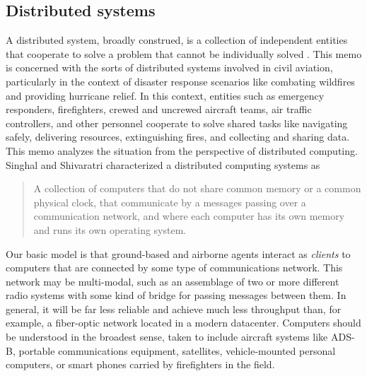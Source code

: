 \subsection{Distributed systems}
A distributed system, broadly construed, is a collection of
independent entities that cooperate to solve a problem that cannot be
individually solved \cite{kshemkalyani_singhal_2008}. This memo is
concerned with the sorts of distributed systems involved in civil
aviation, particularly in the context of disaster response scenarios
like combating wildfires and providing hurricane relief. In this
context, entities such as emergency responders, firefighters, crewed
and uncrewed aircraft teams, air traffic controllers, and other
personnel cooperate to solve shared tasks like navigating safely,
delivering resources, extinguishing fires, and collecting and sharing
data. This memo analyzes the situation from the perspective of
distributed computing. Singhal and Shivaratri \cite{10.5555/562065} characterized a
distributed computing systems as
\begin{quotation}
   A collection of computers that do not share common memory or a common
   physical clock, that communicate by a messages passing over a communication
   network, and where each computer has its own memory and runs its own
   operating system.
\end{quotation}
Our basic model is that ground-based and airborne agents interact as
\emph{clients} to computers that are connected by some type of
communications network. This network may be multi-modal, such as an
assemblage of two or more different radio systems with some kind of
bridge for passing messages between them. In general, it will be far
less reliable and achieve much less throughput than, for example, a
fiber-optic network located in a modern datacenter. Computers should
be understood in the broadest sense, taken to include aircraft systems
like ADS-B, portable communications equipment, satellites,
vehicle-mounted personal computers, or smart phones carried by
firefighters in the field.


